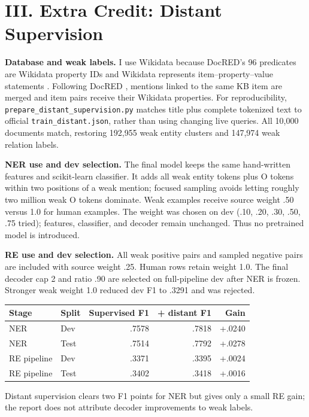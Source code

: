 \documentclass[10pt]{article}
\begin{document}
\newpage\thispagestyle{fancy}\fontsize{8.8}{10.15}\selectfont
\section*{III. Extra Credit: Distant Supervision}
\textbf{Database and weak labels.}
I use Wikidata because DocRED's 96 predicates are Wikidata property IDs and
Wikidata represents item--property--value statements \cite{wikidata}.
Following DocRED \cite{docred}, mentions linked to the same KB item are merged
and item pairs receive their Wikidata properties. For reproducibility,
\texttt{prepare\_distant\_supervision.py} matches title plus complete tokenized
text to official \texttt{train\_distant.json}, rather than using changing live
queries. All 10,000 documents match, restoring 192,955 weak entity clusters
and 147,974 weak relation labels.

\textbf{NER use and dev selection.}
The final model keeps the same hand-written features and scikit-learn
classifier. It adds all weak entity tokens plus O tokens within two positions
of a weak mention; focused sampling avoids letting roughly two million weak O
tokens dominate. Weak examples receive source weight .50 versus 1.0 for human
examples. The weight was chosen on dev (.10, .20, .30, .50, .75 tried);
features, classifier, and decoder remain unchanged. Thus no pretrained model
is introduced.

\textbf{RE use and dev selection.}
All weak positive pairs and sampled negative pairs are included with source
weight .25. Human rows retain weight 1.0. The final decoder cap 2 and ratio
.90 are selected on full-pipeline dev after NER is frozen. Stronger weak weight
1.0 reduced dev F1 to .3291 and was rejected.

\begin{table}[H]\centering\small
\begin{tabular}{@{}llrrr@{}}\toprule
Stage & Split & Supervised F1 & + distant F1 & Gain \\\midrule
NER & Dev  & .7578 & .7818 & +.0240 \\
NER & Test & .7514 & .7792 & +.0278 \\
RE pipeline & Dev  & .3371 & .3395 & +.0024 \\
RE pipeline & Test & .3402 & .3418 & +.0016 \\\bottomrule
\end{tabular}
\par{}
\end{table}
Distant supervision clears two F1 points for NER but gives only a small RE gain;
the report does not attribute decoder improvements to weak labels.
\end{document}
